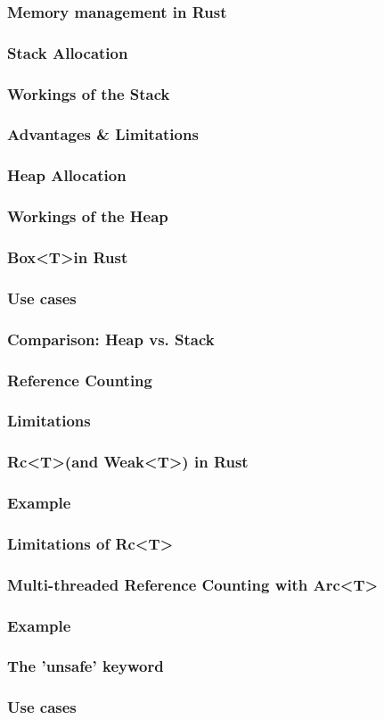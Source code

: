 \documentclass{beamer}
\begin{document}
	\begin{frame}
		\frametitle{Memory management in Rust}
	\end{frame}
	\begin{frame}
		\frametitle{Stack Allocation}
	\end{frame}
	\begin{frame}
		\frametitle{Workings of the Stack}
	\end{frame}
	\begin{frame}
		\frametitle{Advantages \& Limitations}
	\end{frame}
	\begin{frame}
		\frametitle{Heap Allocation}
	\end{frame}
	\begin{frame}
		\frametitle{Workings of the Heap}
	\end{frame}
	\begin{frame}
		\frametitle{Box\textless T\textgreater  in Rust}
	\end{frame}
	\begin{frame}
		\frametitle{Use cases}
	\end{frame}
	\begin{frame}
		\frametitle{Comparison: Heap vs. Stack}
	\end{frame}
	\begin{frame}
		\frametitle{Reference Counting}
	\end{frame}
	\begin{frame}
		\frametitle{Limitations}
	\end{frame}
	\begin{frame}
		\frametitle{Rc\textless T\textgreater (and Weak\textless T\textgreater) in Rust}
	\end{frame}
	\begin{frame}
		\frametitle{Example}
	\end{frame}
	\begin{frame}
		\frametitle{Limitations of Rc\textless T\textgreater}
	\end{frame}
	\begin{frame}
		\frametitle{Multi-threaded Reference Counting with Arc\textless T\textgreater}
	\end{frame}
	\begin{frame}
		\frametitle{Example}
	\end{frame}
	\begin{frame}
		\frametitle{The 'unsafe' keyword}
	\end{frame}
	\begin{frame}
		\frametitle{Use cases}
	\end{frame}
\end{document}
